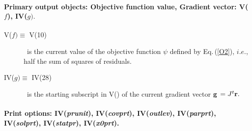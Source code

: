 \documentclass[twoside]{MATH77}
\begin{document}
\paragraph{Primary output objects: Objective function value, Gradient
vector: V($f$), IV($g).$}
\begin{description}
\item[V($f) \equiv $ V(10)]  \ is the current value of the objective
function $\psi $ defined by Eq.\,(\ref{O2}), $i.e.$, half the sum of squares
of residuals.

\item[IV($g) \equiv $ IV(28)]  \ is the starting subscript in V() of the
current gradient vector ${\bf g}$ $=J^t{\bf r}.$
\end{description}
\paragraph{Print options: IV({\em prunit}), IV({\em covprt}),
IV({\em outlev}), IV({\em parprt}), IV({\em solprt}), IV({\em statpr}),
IV({\em x0prt}).}
\end{document}
